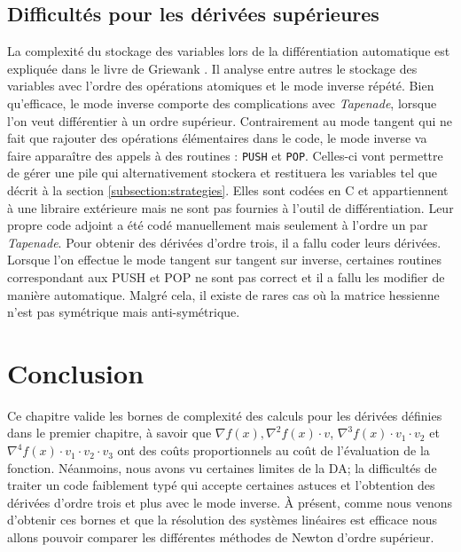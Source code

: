     \subsection{Difficult\'es pour les d\'eriv\'ees sup\'erieures}

La complexit\'e du stockage des variables lors de la diff\'erentiation automatique est expliqu\'ee dans le livre de Griewank
 \cite{Griewank2008EDP}. Il analyse entre autres le stockage des variables avec l'ordre des op\'erations atomiques et le 
mode inverse r\'ep\'et\'e. Bien qu'efficace, le mode inverse comporte des complications avec {\it Tapenade},
 lorsque l'on veut diff\'erentier \`a un ordre sup\'erieur.
Contrairement au mode tangent qui ne fait que rajouter des op\'erations \'el\'ementaires dans le code, le mode inverse
va faire apparaître des appels \`a des routines : {\tt PUSH} et {\tt POP}. Celles-ci vont permettre de g\'erer une pile qui 
alternativement stockera et restituera les variables tel que d\'ecrit \`a la section \ref{subsection:strategies}. Elles sont cod\'ees en C et appartiennent 
\`a une libraire ext\'erieure mais ne sont pas fournies \`a l'outil de diff\'erentiation. Leur propre code adjoint a \'et\'e cod\'e manuellement
mais seulement \`a l'ordre un par {\it Tapenade}. Pour obtenir des d\'eriv\'ees d'ordre trois, il a fallu coder leurs d\'eriv\'ees.
Lorsque l'on effectue le mode tangent sur tangent sur inverse, certaines routines correspondant aux PUSH et POP ne sont pas correct et il a fallu
les modifier de mani\`ere automatique. Malgr\'e cela, il existe de rares cas o\`u la matrice hessienne n'est pas sym\'etrique mais anti-sym\'etrique. 


{\co 
\section{Conclusion}

Ce chapitre valide les bornes de complexit\'e des calculs pour les d\'eriv\'ees d\'efinies dans le premier chapitre, \`a savoir que 
$\nabla f(x), \nabla^2 f(x)\cdot v$, $\nabla^3 f(x)\cdot v_1\cdot v_2$ et $\nabla^4 f(x)\cdot v_1\cdot v_2\cdot v_3$ ont des coûts 
proportionnels au coût de l'\'evaluation de la fonction. N\'eanmoins, nous avons vu certaines limites de la DA; la difficult\'es de traiter un
code faiblement typ\'e qui accepte certaines astuces et l'obtention des d\'eriv\'ees d'ordre trois et plus avec le mode inverse.
 \`A pr\'esent, comme nous venons d'obtenir ces bornes et que la r\'esolution des
syst\`emes lin\'eaires est efficace nous allons pouvoir comparer les diff\'erentes m\'ethodes de Newton d'ordre sup\'erieur. 
}





